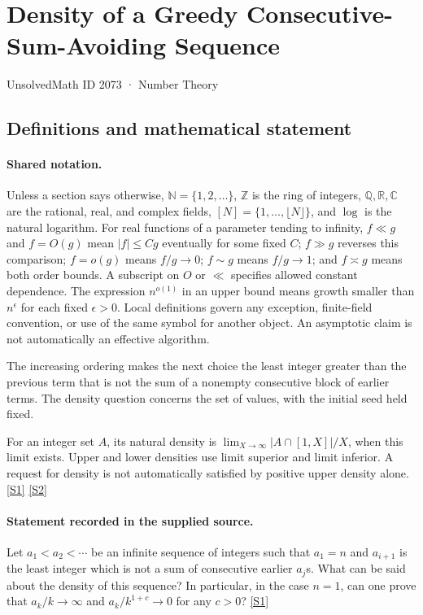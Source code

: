 \documentclass[11pt,a4paper]{article}
\newcommand{\N}{\mathbb{N}}
\newcommand{\Z}{\mathbb{Z}}
\newcommand{\Q}{\mathbb{Q}}
\newcommand{\R}{\mathbb{R}}
\newcommand{\C}{\mathbb{C}}
\newcommand{\sref}[2]{\hyperlink{source:#1:#2}{[S#2]}}
\begin{document}

\setcounter{section}{2072}

\section{Density of a Greedy Consecutive-Sum-Avoiding Sequence}\label{2073}

{\small\sffamily UnsolvedMath ID 2073 · Number Theory}

\subsection{Definitions and mathematical statement}

\paragraph{Shared notation.}Unless a section says otherwise, $\N=\{1,2,\ldots\}$,
$\Z$ is the ring of integers, $\Q,\R,\C$ are the rational, real, and complex
fields, $[N]=\{1,\ldots,\lfloor N\rfloor\}$, and $\log$ is the natural
logarithm. For real functions of a parameter tending to infinity,
$f\ll g$ and $f=O(g)$ mean $|f|\leq Cg$ eventually for some fixed $C$;
$f\gg g$ reverses this comparison; $f=o(g)$ means $f/g\to0$;
$f\sim g$ means $f/g\to1$; and $f\asymp g$ means both order bounds.
A subscript on $O$ or $\ll$ specifies allowed constant dependence.
The expression $n^{o(1)}$ in an upper bound means growth smaller than
$n^\epsilon$ for each fixed $\epsilon>0$. Local definitions govern any
exception, finite-field convention, or use of the same symbol for another
object. An asymptotic claim is not automatically an effective algorithm.



The increasing ordering makes the next choice the least integer greater than the previous term that is not the sum of a nonempty consecutive block of earlier terms. The density question concerns the set of values, with the initial seed held fixed.

For an integer set $A$, its natural density is $\lim_{X\to\infty}|A\cap[1,X]|/X$, when this limit exists. Upper and lower densities use limit superior and limit inferior. A request for density is not automatically satisfied by positive upper density alone. \sref{2073}{1} \sref{2073}{2}

\paragraph{Statement recorded in the supplied source.}
Let $a_1<a_2<\cdots$ be an infinite sequence of integers such that $a_1=n$ and $a_{i+1}$ is the least integer which is not a sum of consecutive earlier $a_j$s. What can be said about the density of this sequence?
In particular, in the case $n=1$, can one prove that $a_k/k\to \infty$ and $a_k/k^{1+c}\to 0$ for any $c>0$? \sref{2073}{1}
\end{document}
